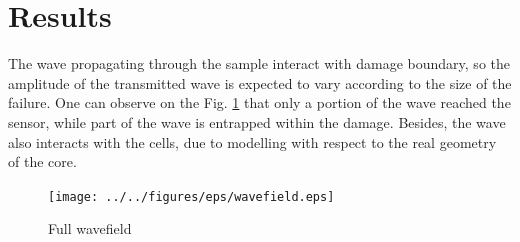 \documentclass[materials,article,submit,moreauthors,pdftex]{Definitions/mdpi}
\begin{document}
{\section{Results}
\label{sec:results}
The wave propagating through the sample interact with damage boundary, so the amplitude of the transmitted wave is expected to vary according to the size of the failure.
One can observe on the Fig. \ref{fig:wavefield} that only a portion of the wave reached the sensor, while part of the wave is entrapped within the damage.
Besides, the wave also interacts with the cells, due to modelling with respect to the real geometry of the core.
\begin{figure}
	\begin{center}
		\texttt{[image: ../../figures/eps/wavefield.eps]}
	\end{center}
	\caption{Full wavefield}
	\label{fig:wavefield}
\end{figure}

}
\end{document}
